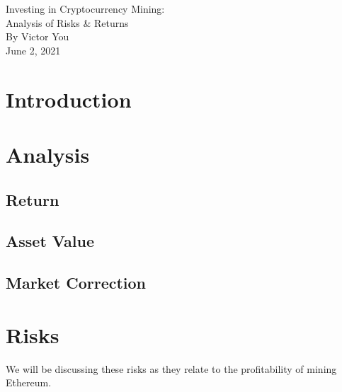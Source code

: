 \documentclass[a4paper,11pt]{article}
\begin{document}
\begin{titlepage}

\begin{center}
\vspace*{6cm}
\Huge Investing in Cryptocurrency Mining:\\
\huge Analysis of Risks \& Returns\\
\vspace*{1cm}
\large By Victor You\\
\vspace*{0.5cm}
\large June 2, 2021
\end{center}
\end{titlepage}

\tableofcontents
{}
\clearpage
{}
\setcounter{page}{1}

\section{Introduction}
\vspace{-10pt}

\vspace{-10pt}

\section{Analysis}
\vspace{-10pt}
\subsection{Return}
\subsection{Asset Value}
\subsection{Market Correction}
\vspace{-10pt}

\section{Risks}
\vspace{-10pt}
We will be discussing these risks as they relate to the profitability of mining Ethereum.
\vspace{-10pt}
\end{document}
